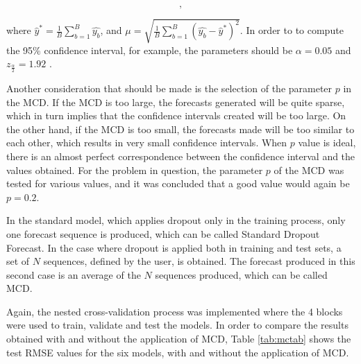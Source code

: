 \begin{equation}
    [\hat{y}^* - z_{\frac{\alpha}{2}}\mu,\ \hat{y}^* + z_{\frac{\alpha}{2}}\mu], 
\end{equation}

where $\hat{y}^* = \frac{1}{B}\sum_{b=1}^B\hat{y_b}$, and $\mu = \sqrt{\frac{1}{B}\sum_{b=1}^B(\hat{y_b} -\hat{y}^*)^2}$. In order to to compute the 95\% confidence interval, for example, the parameters should be $\alpha=0.05$ and $z_{\frac{\alpha}{2}}= 1.92$ . 

Another consideration that should be made is the selection of the parameter $p$ in the \ac{MCD}. If the \ac{MCD} is too large, the forecasts generated will be quite sparse, which in turn implies that the confidence intervals created will be too large. On the other hand, if the \ac{MCD} is too small, the forecasts made will be too similar to each other, which results in very small confidence intervals. When $p$ value is ideal, there is an almost perfect correspondence between the confidence interval and the values obtained. For the problem in question, the parameter $p$ of the \ac{MCD} was tested for various values, and it was concluded that a good value would again be $p = 0.2$. 

In the standard model, which applies dropout only in the training process, only one forecast sequence is produced, which can be called Standard Dropout Forecast. In the case where dropout is applied both in training and test sets, a set of $N$ sequences, defined by the user, is obtained. The forecast produced in this second case is an average of the $N$ sequences produced, which can be called \ac{MCD}.

Again, the nested cross-validation process was implemented where the 4 blocks were used to train, validate and test the models. In order to compare the results obtained with and without the application of \ac{MCD}, Table \ref{tab:mctab} shows the test \ac{RMSE} values for the six models, with and without the application of \ac{MCD}.

